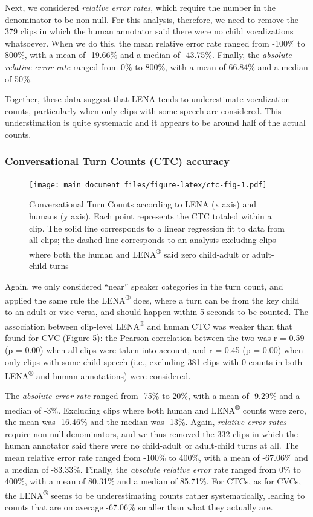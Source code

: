 \documentclass[english,floatsintext,man]{apa6}
\begin{document}
Next, we considered \emph{relative error rates}, which require the
number in the denominator to be non-null. For this analysis, therefore,
we need to remove the 379 clips in which the human annotator said there
were no child vocalizations whatsoever. When we do this, the mean
relative error rate ranged from -100\% to 800\%, with a mean of -19.66\%
and a median of -43.75\%. Finally, the \emph{absolute relative error
rate} ranged from 0\% to 800\%, with a mean of 66.84\% and a median of
50\%.

Together, these data suggest that LENA tends to underestimate
vocalization counts, particularly when only clips with some speech are
considered. This understimation is quite systematic and it appears to be
around half of the actual counts.

\subsubsection{Conversational Turn Counts (CTC)
accuracy}\label{conversational-turn-counts-ctc-accuracy}

\begin{figure}
\centering
\texttt{[image: main\_document\_files/figure-latex/ctc-fig-1.pdf]}
\caption{\label{fig:ctc-fig}Conversational Turn Counts according to LENA (x
axis) and humans (y axis). Each point represents the CTC totaled within
a clip. The solid line corresponds to a linear regression fit to data
from all clips; the dashed line corresponds to an analysis excluding
clips where both the human and LENA\textsuperscript{®} said zero
child-adult or adult-child turns}
\end{figure}

Again, we only considered \enquote{near} speaker categories in the turn
count, and applied the same rule the LENA\textsuperscript{®} does, where
a turn can be from the key child to an adult or vice versa, and should
happen within 5 seconds to be counted. The association between
clip-level LENA\textsuperscript{®} and human CTC was weaker than that
found for CVC (Figure 5): the Pearson correlation between the two was r
= 0.59 (p = 0.00) when all clips were taken into account, and r = 0.45
(p = 0.00) when only clips with some child speech (i.e., excluding 381
clips with 0 counts in both LENA\textsuperscript{®} and human
annotations) were considered.

The \emph{absolute error rate} ranged from -75\% to 20\%, with a mean of
-9.29\% and a median of -3\%. Excluding clips where both human and
LENA\textsuperscript{®} counts were zero, the mean was -16.46\% and the
median was -13\%. Again, \emph{relative error rates} require non-null
denominators, and we thus removed the 332 clips in which the human
annotator said there were no child-adult or adult-child turns at all.
The mean relative error rate ranged from -100\% to 400\%, with a mean of
-67.06\% and a median of -83.33\%. Finally, the \emph{absolute relative
error} rate ranged from 0\% to 400\%, with a mean of 80.31\% and a
median of 85.71\%. For CTCs, as for CVCs, the LENA\textsuperscript{®}
seems to be underestimating counts rather systematically, leading to
counts that are on average -67.06\% smaller than what they actually are.
\end{document}
